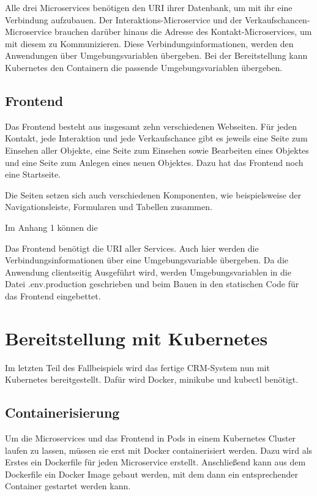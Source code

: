 Alle drei Microservices benötigen den \ac{URI} ihrer Datenbank, um mit ihr eine Verbindung aufzubauen. Der Interaktions-Microservice und der Verkaufschancen-Microservice brauchen darüber hinaus die Adresse des Kontakt-Microservices, um mit diesem zu Kommunizieren. Diese Verbindungsinformationen, werden den Anwendungen über Umgebungsvariablen übergeben. Bei der Bereitstellung kann Kubernetes den Containern die passende Umgebungsvariablen übergeben.

\subsection{Frontend}

Das Frontend besteht aus insgesamt zehn verschiedenen Webseiten. Für jeden Kontakt, jede Interaktion und jede Verkaufschance gibt es jeweils eine Seite zum Einsehen aller Objekte, eine Seite zum Einsehen sowie Bearbeiten eines Objektes und eine Seite zum Anlegen eines neuen Objektes. Dazu hat das Frontend noch eine Startseite. 

Die Seiten setzen sich auch verschiedenen Komponenten, wie beispielsweise der Navigationsleiste, Formularen und Tabellen zusammen. 

Im Anhang 1 können die 


Das Frontend benötigt die \ac{URI} aller Services. Auch hier werden die Verbindungsinformationen über eine Umgebungsvariable übergeben. Da die Anwendung clientseitig Ausgeführt wird, werden Umgebungsvariablen in die Datei .env.production geschrieben und beim Bauen in den statischen Code für das Frontend eingebettet.

\clearpage
\section{Bereitstellung mit Kubernetes}

Im letzten Teil des Fallbeispiels wird das fertige CRM-System nun mit Kubernetes bereitgestellt. Dafür wird Docker, minikube und kubectl benötigt.

\subsection{Containerisierung}

Um die Microservices und das Frontend in Pods in einem Kubernetes Cluster laufen zu lassen, müssen sie erst mit Docker containerisiert werden. Dazu wird als Erstes ein Dockerfile für jeden Microservice erstellt. Anschließend kann aus dem Dockerfile ein Docker Image gebaut werden, mit dem dann ein entsprechender Container gestartet werden kann.

